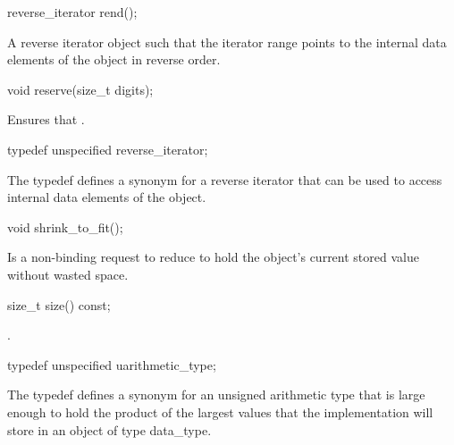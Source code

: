 \begin{addedblock}
\begin{itemdecl}
reverse_iterator rend();
\end{itemdecl}

\begin{itemdescr}
\returns A reverse iterator object such that the iterator range \tcode{[crbegin(), crend())} points to the internal data elements of the  object in reverse order.
\end{itemdescr}

\begin{itemdecl}
void reserve(size_t digits);
\end{itemdecl}

\begin{itemdescr}
\effects Ensures that .
\end{itemdescr}

\begin{itemdecl}
typedef unspecified reverse_iterator;
\end{itemdecl}

\begin{itemdescr}
The typedef defines a synonym for a reverse iterator that can be used to access internal data elements of the  object.
\end{itemdescr}

\begin{itemdecl}
void shrink_to_fit();
\end{itemdecl}

\begin{itemdescr}
\effect Is a non-binding request to reduce  to hold the  object's current stored value without wasted space.
\end{itemdescr}

\begin{itemdecl}
size_t size() const;
\end{itemdecl}

\begin{itemdescr}
\returns {}.
\end{itemdescr}

\begin{itemdecl}
typedef unspecified uarithmetic_type;
\end{itemdecl}

\begin{itemdescr}
The typedef defines a synonym for an unsigned arithmetic type that is large enough to hold the product of the largest values that the implementation will store in an object of type data_type.
\end{itemdescr}


\end{addedblock}
